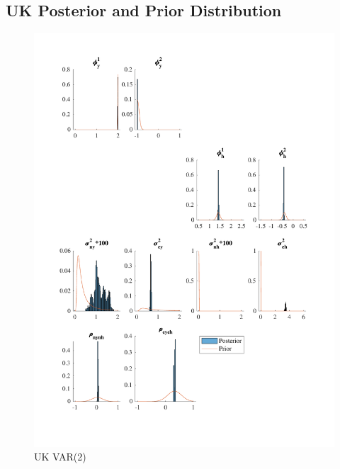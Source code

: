 \documentclass[
  12pt,
]{article}
\begin{document}
\hypertarget{uk-posterior-and-prior-distribution}{%
\subsection{UK Posterior and Prior Distribution}\label{uk-posterior-and-prior-distribution}}

\begin{figure}

{\centering \includegraphics[width=0.85\linewidth]{../../Regression/Bayesian_UC_VAR2_drift/OutputData/posteriorpriordistribution_UK} 

}

\caption{UK VAR(2)}\label{fig:unnamed-chunk-9}
\end{figure}
\end{document}
